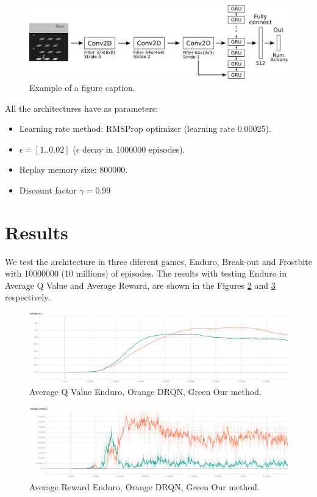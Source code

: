 \documentclass[conference]{IEEEtran}
\begin{document}
\begin{figure}[htbp]
\centerline{\includegraphics[width=\linewidth]{images/DGQN.png}}
\caption{Example of a figure caption.}
\label{dgrqn}
\end{figure}

All the architectures have as parameters:

\begin{itemize}
\item Learning rate method: RMSProp optimizer (learning rate 0.00025).
\item $\epsilon=[1 .. 0.02]$ ($\epsilon$ decay in 1000000 episodes).
\item Replay memory size: 800000.
\item Discount factor $\gamma = 0.99$
\end{itemize}



\section{Results}

We test the architecture in three diferent games, Enduro, Break-out and Frostbite with 10000000 (10 millions) of episodes. The results with testing Enduro in Average Q Value and Average Reward, are shown in the Figures \ref{enduro-q} and \ref{enduro-r} respectively.

\begin{figure}[htbp]
\centerline{\includegraphics[width=\linewidth]{images/enduro-averQ-drqn-or-dgruqn-gr.png}}
\caption{Average Q Value Enduro, Orange DRQN, Green Our method.}
\label{enduro-q}
\end{figure}

\begin{figure}[htbp]
\centerline{\includegraphics[width=\linewidth]{images/enduro-av-rew-drqn-or-dgruqn-gr.png}}
\caption{Average Reward Enduro, Orange DRQN, Green Our method.}
\label{enduro-r}
\end{figure}
\end{document}
